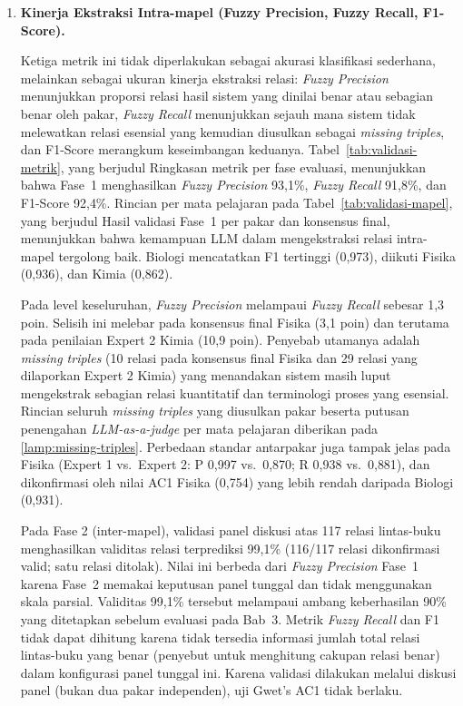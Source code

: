 \documentclass[../../thesis]{subfiles}
\begin{document}
\begin{enumerate}
  \item \textbf{Kinerja Ekstraksi Intra-mapel (Fuzzy Precision, Fuzzy Recall, F1-Score).}

  Ketiga metrik ini tidak diperlakukan sebagai akurasi klasifikasi sederhana,
  melainkan sebagai ukuran kinerja ekstraksi relasi: \textit{Fuzzy Precision}
  menunjukkan proporsi relasi hasil sistem yang dinilai benar atau sebagian
  benar oleh pakar, \textit{Fuzzy Recall} menunjukkan sejauh mana sistem tidak
  melewatkan relasi esensial yang kemudian diusulkan sebagai
  \textit{missing triples}, dan F1-Score merangkum keseimbangan keduanya.
  Tabel~\ref{tab:validasi-metrik}, yang berjudul Ringkasan metrik per fase evaluasi,
  menunjukkan bahwa Fase~1 menghasilkan \textit{Fuzzy Precision} 93{,}1\%,
  \textit{Fuzzy Recall} 91{,}8\%, dan F1-Score 92{,}4\%. Rincian per mata
  pelajaran pada Tabel~\ref{tab:validasi-mapel}, yang berjudul Hasil validasi
  Fase~1 per pakar dan konsensus final, menunjukkan bahwa
  kemampuan LLM dalam mengekstraksi relasi intra-mapel tergolong baik. Biologi
  mencatatkan F1 tertinggi (0{,}973), diikuti Fisika (0{,}936), dan Kimia (0{,}862).

  Pada level keseluruhan, \textit{Fuzzy Precision} melampaui \textit{Fuzzy Recall} sebesar
  1{,}3 poin. Selisih ini melebar pada konsensus final Fisika (3{,}1 poin) dan
  terutama pada penilaian Expert 2 Kimia (10{,}9 poin). Penyebab utamanya adalah
  \textit{missing triples} (10 relasi pada konsensus final Fisika dan 29 relasi
  yang dilaporkan Expert 2 Kimia) yang menandakan sistem masih luput
  mengekstrak sebagian relasi kuantitatif dan terminologi proses yang esensial.
  Rincian seluruh \textit{missing triples} yang diusulkan pakar beserta putusan
  penengahan \textit{LLM-as-a-judge} per mata pelajaran diberikan pada
  \ref{lamp:missing-triples}.
  Perbedaan standar antarpakar juga tampak jelas pada Fisika (Expert 1 vs.\
  Expert 2: P 0{,}997 vs.\ 0{,}870; R 0{,}938 vs.\ 0{,}881), dan dikonfirmasi
  oleh nilai AC1 Fisika (0{,}754) yang lebih rendah daripada Biologi (0{,}931).

  Pada Fase 2 (inter-mapel), validasi panel diskusi atas 117 relasi lintas-buku
  menghasilkan validitas relasi terprediksi 99{,}1\% (116/117 relasi
  dikonfirmasi valid; satu relasi ditolak). Nilai ini berbeda dari
  \textit{Fuzzy Precision} Fase~1 karena Fase~2 memakai keputusan panel tunggal
  dan tidak menggunakan skala parsial. Validitas 99{,}1\% tersebut melampaui
  ambang keberhasilan 90\% yang ditetapkan sebelum evaluasi pada Bab~3. Metrik
  \textit{Fuzzy Recall} dan F1 tidak dapat dihitung
  karena tidak tersedia informasi jumlah total relasi lintas-buku yang benar
  (penyebut untuk menghitung cakupan relasi benar) dalam konfigurasi panel tunggal ini. Karena validasi
  dilakukan melalui diskusi panel (bukan dua pakar independen), uji Gwet's AC1
  tidak berlaku.


\end{enumerate}
\end{document}
